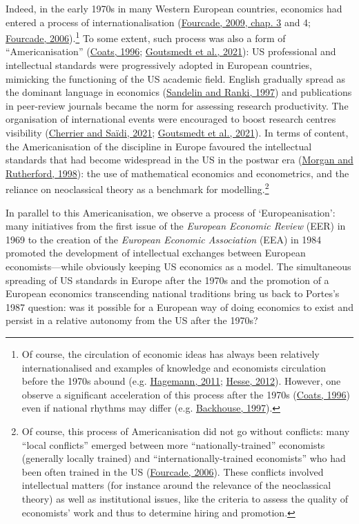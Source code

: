 \documentclass[
]{article}
\begin{document}
Indeed, in the early 1970s in many Western European countries, economics
had entered a process of internationalisation
(\protect\hyperlink{ref-fourcade2009}{Fourcade, 2009, chap. 3} and 4;
\protect\hyperlink{ref-fourcade2006}{Fourcade, 2006}).\footnote{Of
  course, the circulation of economic ideas has always been relatively
  internationalised and examples of knowledge and economists circulation
  before the 1970s abound (e.g.
  \protect\hyperlink{ref-hagemann2011a}{Hagemann, 2011};
  \protect\hyperlink{ref-hesse2012}{Hesse, 2012}). However, one observe
  a significant acceleration of this process after the 1970s
  (\protect\hyperlink{ref-coats1996}{Coats, 1996}) even if national
  rhythms may differ (e.g.
  \protect\hyperlink{ref-backhouse1997a}{Backhouse, 1997}).} To some
extent, such process was also a form of ``Americanisation''
(\protect\hyperlink{ref-coats1996}{Coats, 1996};
\protect\hyperlink{ref-goutsmedt2021}{Goutsmedt et al., 2021}): US
professional and intellectual standards were progressively adopted in
European countries, mimicking the functioning of the US academic field.
English gradually spread as the dominant language in economics
(\protect\hyperlink{ref-sandelin1997}{Sandelin and Ranki, 1997}) and
publications in peer-review journals became the norm for assessing
research productivity. The organisation of international events were
encouraged to boost research centres visibility
(\protect\hyperlink{ref-cherrier2021}{Cherrier and Saïdi, 2021};
\protect\hyperlink{ref-goutsmedt2021}{Goutsmedt et al., 2021}). In terms
of content, the Americanisation of the discipline in Europe favoured the
intellectual standards that had become widespread in the US in the
postwar era (\protect\hyperlink{ref-morgan1998}{Morgan and Rutherford,
1998}): the use of mathematical economics and econometrics, and the
reliance on neoclassical theory as a benchmark for modelling.\footnote{Of
  course, this process of Americanisation did not go without conflicts:
  many ``local conflicts'' emerged between more ``nationally-trained''
  economists (generally locally trained) and ``internationally-trained
  economists'' who had been often trained in the US
  (\protect\hyperlink{ref-fourcade2006}{Fourcade, 2006}). These
  conflicts involved intellectual matters (for instance around the
  relevance of the neoclassical theory) as well as institutional issues,
  like the criteria to assess the quality of economists' work and thus
  to determine hiring and promotion.}

In parallel to this Americanisation, we observe a process of
`Europeanisation': many initiatives from the first issue of the
\emph{European Economic Review} (EER) in 1969 to the creation of the
\emph{European Economic Association} (EEA) in 1984 promoted the
development of intellectual exchanges between European
economists---while obviously keeping US economics as a model. The
simultaneous spreading of US standards in Europe after the 1970s and the
promotion of a European economics transcending national traditions bring
us back to Portes's 1987 question: was it possible for a European way of
doing economics to exist and persist in a relative autonomy from the US
after the 1970s?
\end{document}
